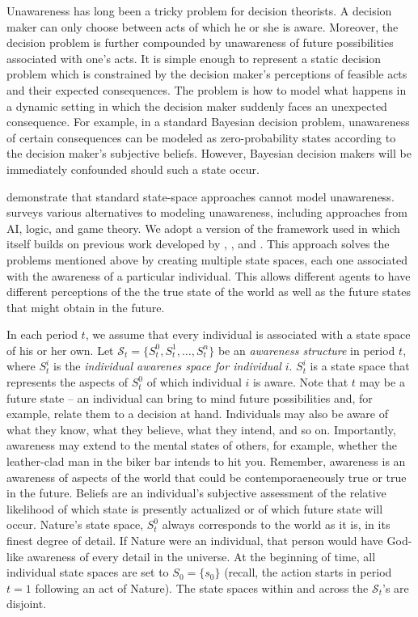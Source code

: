 \documentclass[
11pt,
titlepage,
reqno,
]{article}%
\theoremstyle{definition}
\begin{document}
Unawareness has long been a tricky problem for decision theorists. 
A decision maker can only choose between acts of which he or she is aware. 
Moreover, the decision problem is further compounded by unawareness of future possibilities associated with one's acts. 
It is simple enough to represent a static decision problem which is constrained by the decision maker's perceptions of feasible acts and their expected consequences.
The problem is how to model what happens in a dynamic setting in which the decision maker suddenly faces an unexpected consequence. 
For example, in a standard Bayesian decision problem, unawareness of certain consequences can be modeled as zero-probability states according to the decision maker's subjective beliefs. 
However, Bayesian decision makers will be immediately confounded should such a state occur.  

\citet{Dekel1998} demonstrate that standard state-space approaches cannot model unawareness. \citet{Schipper2015} surveys various alternatives to modeling unawareness, including approaches from  AI, logic, and game theory. We adopt a version of the framework used in   \cite{bryan2020value} which itself builds on previous work developed by \citet{Heifetz2006}, \citet{Heifetz2008}, and \citet{Heifetz2013}. This approach solves the problems mentioned above by creating multiple state spaces, each one associated with the awareness of a particular individual. This allows different agents to have different perceptions of the the true state of the world as well as the future states that might obtain in the future. 

In each period $t$, we assume that every individual is associated with a state space of his or her own. 
Let $\mathcal{S}_t =\{S^0_t, S^1_t,\ldots,S^n_t\}$ be an \textit{awareness structure} in period $t$, where $S^i_t$ is the \textit{individual awarenes space for individual} $i$.
$S^i_t$ is a state space that represents the aspects of $S^0_t$ of which individual $i$ is aware. 
Note that $t$ may be a future state -- an individual can bring to mind future possibilities and, for example, relate them to a decision at hand.
Individuals may also be aware of what they know, what they believe, what they intend, and so on. 
Importantly, awareness may extend to the mental states of others, for example, whether the leather-clad man in the biker bar intends to hit you.
Remember, awareness is an awareness of aspects of the world that could be contemporaeneously true or true in the future.
Beliefs are an individual's subjective assessment of the relative likelihood of which state is presently actualized or of which future state will  occur.  
Nature's state space, $S^0_t$ always corresponds to the world as it is, in its  finest degree of detail. 
If Nature were an individual, that person would have God-like awareness of every detail in the universe. 
At the beginning of time, all individual state spaces are set to $S_0=\{s_0\}$ (recall, the action starts in period $t=1$ following an act of Nature).
The state spaces within and across the $\mathcal{S}_t$'s are disjoint. 
 
\end{document}
